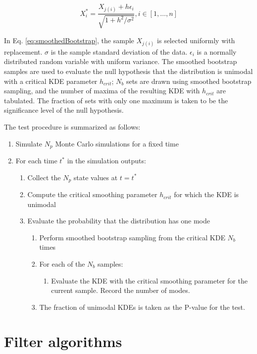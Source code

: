 \documentclass[]{article}
\begin{document}
\begin{equation}
X_i^* = \frac{X_{j(i)} + h\epsilon_i}{\sqrt{1+h^2/\sigma^2}}, i \in [1,\dots,n]
\label{eq:smoothedBootstrap}
\end{equation}

In Eq. \ref{eq:smoothedBootstrap}, the sample $X_{j(i)}$ is selected uniformly with replacement. $\sigma$ is the sample standard deviation of the data. $\epsilon_i$ is a normally distributed random variable with uniform variance. The smoothed bootstrap samples are used to evaluate the null hypothesis that the distribution is unimodal with a critical KDE parameter $h_{crit}$; $N_b$ sets are drawn using smoothed bootstrap sampling, and the number of maxima of the resulting KDE with $h_{crit}$ are tabulated. The fraction of sets with only one maximum is taken to be the significance level of the null hypothesis.

The test procedure is summarized as follows:

\begin{enumerate}
\item Simulate $N_p$ Monte Carlo simulations for a fixed time
\item For each time $t^*$ in the simulation outputs:
\begin{enumerate}
	\item Collect the $N_p$ state values at $t = t^*$
	\item Compute the critical smoothing parameter $h_{crit}$ for which the KDE is unimodal
	\item Evaluate the probability that the distribution has one mode
	\begin{enumerate}
		\item Perform smoothed bootstrap sampling from the critical KDE $N_b$ times
		\item For each of the $N_b$ samples:
		\begin{enumerate}
			\item Evaluate the KDE with the critical smoothing parameter for the current sample. Record the number of modes.
		\end{enumerate}
		\item The fraction of unimodal KDEs is taken as the P-value for the test.	
	\end{enumerate}
\end{enumerate}
\end{enumerate}

\section{Filter algorithms}
\end{document}
